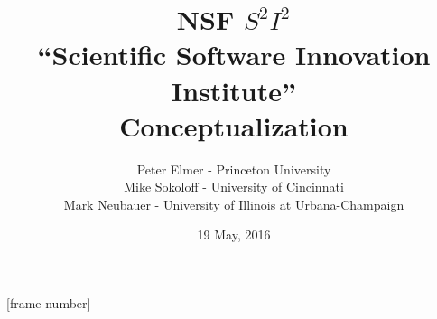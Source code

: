 \documentclass{beamer}
\title{NSF $ S^2 I^2 $\\ ``Scientific Software Innovation Institute'' \\ Conceptualization}
\author{Peter Elmer - Princeton University \\
        Mike Sokoloff - University of Cincinnati \\
        Mark Neubauer - University of Illinois at Urbana-Champaign}
\date{19 May, 2016}
\begin{document}
\maketitle

%
%

[frame number]


%




















%

\end{document}
